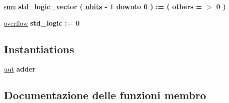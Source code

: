 \begin{DoxyCompactItemize}
\item 
\hyperlink{classtb__adder_1_1behavior_a5db139547621616405be3e820278d444}{sum} {\bfseries \textcolor{vhdlchar}{std\+\_\+logic\+\_\+vector}\textcolor{vhdlchar}{ }\textcolor{vhdlchar}{(}\textcolor{vhdlchar}{ }\textcolor{vhdlchar}{ }\textcolor{vhdlchar}{ }\textcolor{vhdlchar}{ }{\bfseries \hyperlink{classtb__adder_1_1behavior_aff8823a253db156c5a7a40d1b813343f}{nbits}} \textcolor{vhdlchar}{-\/}\textcolor{vhdlchar}{ } \textcolor{vhdldigit}{1} \textcolor{vhdlchar}{ }\textcolor{vhdlchar}{downto}\textcolor{vhdlchar}{ }\textcolor{vhdlchar}{ } \textcolor{vhdldigit}{0} \textcolor{vhdlchar}{ }\textcolor{vhdlchar}{)}\textcolor{vhdlchar}{ }\textcolor{vhdlchar}{ }\textcolor{vhdlchar}{ }\textcolor{vhdlchar}{\+:}\textcolor{vhdlchar}{=}\textcolor{vhdlchar}{ }\textcolor{vhdlchar}{(}\textcolor{vhdlchar}{ }\textcolor{vhdlchar}{ }\textcolor{vhdlchar}{others}\textcolor{vhdlchar}{ }\textcolor{vhdlchar}{ }\textcolor{vhdlchar}{=}\textcolor{vhdlchar}{ }\textcolor{vhdlchar}{$>$}\textcolor{vhdlchar}{ }\textcolor{vhdlchar}{\textquotesingle{}}\textcolor{vhdlchar}{ } \textcolor{vhdldigit}{0} \textcolor{vhdlchar}{ }\textcolor{vhdlchar}{\textquotesingle{}}\textcolor{vhdlchar}{ }\textcolor{vhdlchar}{)}\textcolor{vhdlchar}{ }} 
\item 
\hyperlink{classtb__adder_1_1behavior_ab579763af0d4bea3c24be9431798eeea}{overflow} {\bfseries \textcolor{vhdlchar}{std\+\_\+logic}\textcolor{vhdlchar}{ }\textcolor{vhdlchar}{ }\textcolor{vhdlchar}{\+:}\textcolor{vhdlchar}{=}\textcolor{vhdlchar}{ }\textcolor{vhdlchar}{ }\textcolor{vhdlchar}{\textquotesingle{}}\textcolor{vhdlchar}{ } \textcolor{vhdldigit}{0} \textcolor{vhdlchar}{ }\textcolor{vhdlchar}{\textquotesingle{}}\textcolor{vhdlchar}{ }} 
\end{DoxyCompactItemize}
\subsection*{Instantiations}
 \begin{DoxyCompactItemize}
\item 
\hyperlink{classtb__adder_1_1behavior_a1619316ad715601eb5d3559db829ac05}{uut}  {\bfseries adder}   
\end{DoxyCompactItemize}


\subsection{Documentazione delle funzioni membro}
